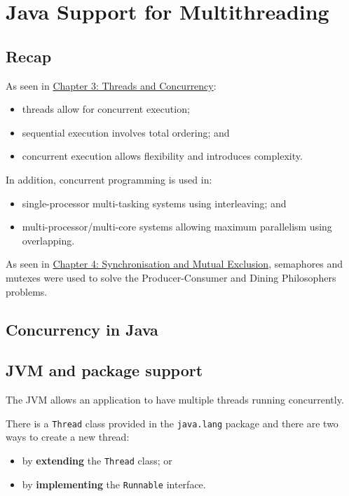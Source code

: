 \documentclass[a4paper]{systems-software}
\begin{document}
\chapter{Java Support for Multithreading}

\section{Recap}

As seen in \hyperref[chap:3]{Chapter 3: Threads and Concurrency}:
\begin{itemize}
	\item threads allow for concurrent execution;
	\item sequential execution involves total ordering; and
	\item concurrent execution allows flexibility and introduces complexity.
\end{itemize}
In addition, concurrent programming is used in:
\begin{itemize}
	\item single-processor multi-tasking systems using interleaving; and
	\item multi-processor/multi-core systems allowing maximum parallelism using overlapping.
\end{itemize}

As seen in \hyperref[chap:4]{Chapter 4: Synchronisation and Mutual Exclusion}, semaphores and mutexes were used to solve the Producer-Consumer and Dining Philosophers problems.


\section{Concurrency in Java}

\section*{JVM and package support}

The JVM allows an application to have multiple threads running concurrently.

There is a \texttt{Thread} class provided in the \texttt{java.lang} package and there are two ways to create a new thread:
\begin{itemize}
	\item by \textbf{extending} the \texttt{Thread} class; or
	\item by \textbf{implementing} the \texttt{Runnable} interface.
\end{itemize}
\end{document}
